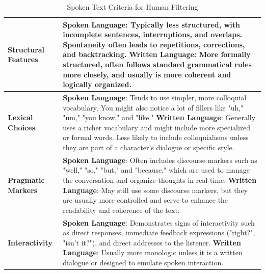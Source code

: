 \documentclass[11pt]{article}
\begin{document}
\begin{table}[htbp]
\centering
\begin{tabular}{|p{}|p{}|}
\hline
\textbf{Structural Features} & \textbf{Spoken Language}: Typically less structured, with incomplete sentences, interruptions, and overlaps. Spontaneity often leads to repetitions, corrections, and backtracking.
\newline\textbf{Written Language}: More formally structured, often follows standard grammatical rules more closely, and usually is more coherent and logically organized. \\
\hline
\textbf{Lexical Choices} & \textbf{Spoken Language}: Tends to use simpler, more colloquial vocabulary. You might also notice a lot of fillers like "uh," "um," "you know," and "like."
\newline\textbf{Written Language}: Generally uses a richer vocabulary and might include more specialized or formal words. Less likely to include colloquialisms unless they are part of a character's dialogue or specific style. \\
\hline
\textbf{Pragmatic Markers} & \textbf{Spoken Language}: Often includes discourse markers such as "well," "so," "but," and "because," which are used to manage the conversation and organize thoughts in real-time.
\newline\textbf{Written Language}: May still use some discourse markers, but they are usually more controlled and serve to enhance the readability and coherence of the text. \\
\hline
\textbf{Interactivity} & \textbf{Spoken Language}: Demonstrates signs of interactivity such as direct responses, immediate feedback expressions ("right?", "isn't it?"), and direct addresses to the listener.
\newline\textbf{Written Language}: Usually more monologic unless it is a written dialogue or designed to emulate spoken interaction. \\
\hline
\end{tabular}
\caption{Spoken Text Criteria for Human Filtering}
\label{tab:humanFiltering}
\end{table}
\end{document}
